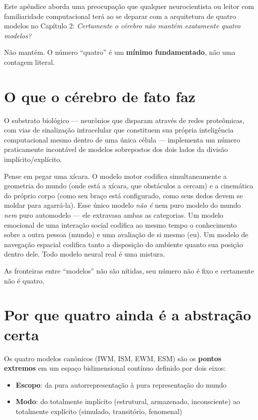 \documentclass[11pt, twoside, openright]{book}
\begin{document}
Este apêndice aborda uma preocupação que qualquer neurocientista ou leitor com familiaridade computacional terá ao se deparar com a arquitetura de quatro modelos no Capítulo 2: \textit{Certamente o cérebro não mantém exatamente quatro modelos?}

Não mantém. O número ``quatro'' é um \textbf{mínimo fundamentado}, não uma contagem literal.

\section*{O que o cérebro de fato faz}

O substrato biológico --- neurônios que disparam através de redes proteômicas, com vias de sinalização intracelular que constituem sua própria inteligência computacional mesmo dentro de uma única célula --- implementa um número praticamente incontável de modelos sobrepostos dos dois lados da divisão implícito/\allowbreak{}explícito.

Pense em pegar uma xícara. O modelo motor codifica simultaneamente a geometria do mundo (onde está a xícara, que obstáculos a cercam) e a cinemática do próprio corpo (como seu braço está configurado, como seus dedos devem se moldar para agarrá-la). Esse único modelo \textit{não é} nem puro modelo do mundo \textit{nem} puro automodelo --- ele extravasa ambas as categorias. Um modelo emocional de uma interação social codifica ao mesmo tempo o conhecimento sobre a outra pessoa (mundo) e uma avaliação de si mesmo (eu). Um modelo de navegação espacial codifica tanto a disposição do ambiente quanto sua posição dentro dele. Todo modelo neural real é uma mistura.

As fronteiras entre ``modelos'' não são nítidas, seu número não é fixo e certamente não é quatro.

\section*{Por que quatro ainda é a abstração certa}

Os quatro modelos canônicos (IWM, ISM, EWM, ESM) são os \textbf{pontos extremos} em um espaço bidimensional contínuo definido por dois eixos:

\begin{itemize}
  \item \textbf{Escopo}: da pura autorrepresentação à pura representação do mundo
  \item \textbf{Modo}: do totalmente implícito (estrutural, armazenado, inconsciente) ao totalmente explícito (simulado, transitório, fenomenal)
\end{itemize}
\end{document}
